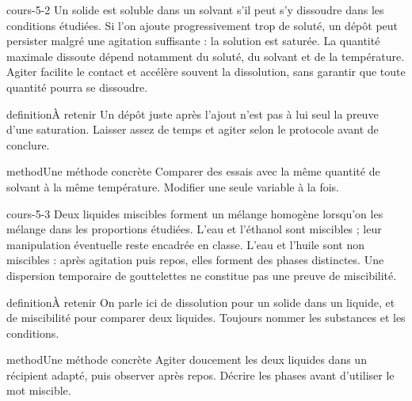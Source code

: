 \documentclass[12pt,twoside,openany]{book}
\begin{document}
\label{ch-5-cours-2}
\begin{pcFiche}{cours-5-2}
Un solide est soluble dans un solvant s’il peut s’y dissoudre dans les conditions étudiées. Si l’on ajoute progressivement trop de soluté, un dépôt peut persister malgré une agitation suffisante : la solution est saturée. La quantité maximale dissoute dépend notamment du soluté, du solvant et de la température. Agiter facilite le contact et accélère souvent la dissolution, sans garantir que toute quantité pourra se dissoudre.\par
{}
\begin{pcEncadre}{definition}{À retenir}
Un dépôt juste après l’ajout n’est pas à lui seul la preuve d’une saturation. Laisser assez de temps et agiter selon le protocole avant de conclure.\par
\end{pcEncadre}
\begin{pcEncadre}{method}{Une méthode concrète}
Comparer des essais avec la même quantité de solvant à la même température. Modifier une seule variable à la fois.\par
\end{pcEncadre}
\end{pcFiche}
\label{ch-5-cours-3}
\begin{pcFiche}{cours-5-3}
Deux liquides miscibles forment un mélange homogène lorsqu’on les mélange dans les proportions étudiées. L’eau et l’éthanol sont miscibles ; leur manipulation éventuelle reste encadrée en classe. L’eau et l’huile sont non miscibles : après agitation puis repos, elles forment des phases distinctes. Une dispersion temporaire de gouttelettes ne constitue pas une preuve de miscibilité.\par
{}
\begin{pcEncadre}{definition}{À retenir}
On parle ici de dissolution pour un solide dans un liquide, et de miscibilité pour comparer deux liquides. Toujours nommer les substances et les conditions.\par
\end{pcEncadre}
\begin{pcEncadre}{method}{Une méthode concrète}
Agiter doucement les deux liquides dans un récipient adapté, puis observer après repos. Décrire les phases avant d’utiliser le mot miscible.\par
\end{pcEncadre}
\end{pcFiche}
\end{document}
